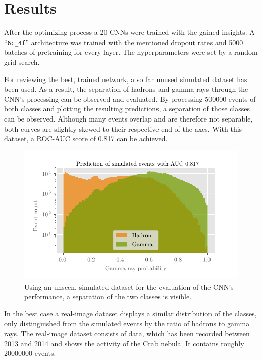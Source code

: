 \chapter{Results}

After the optimizing process a \num{20} CNNs were trained with the gained insights.
A \enquote{\texttt{6c\_4f}} architecture was trained with the mentioned dropout rates
and \num{5000} batches of pretraining for every layer.
The hyperparameters were set by a random grid search.

For reviewing the best, trained network, a so far unused simulated dataset has been used.
As a result, the separation of hadrons and gamma rays through the CNN's processing can be observed and evaluated.
By processing \num{500000} events of both classes and plotting the resulting predictions,
a separation of those classes can be observed.
Although many events overlap and are therefore not separable,
both curves are slightly skewed to their respective end of the axes.
With this dataset, a ROC-AUC score of \num{0.817} can be achieved.

\begin{figure}
    \centering
    \includegraphics[scale=1]{Plots/CNN_MC_Evaluation.pdf}
    \caption{Using an unseen, simulated dataset for the evaluation of the CNN's performance, a separation of the two classes is visible.}
    \label{fig:cnn_mc_evaluation}
\end{figure}

In the best case a real-image dataset displays a similar distribution of the classes,
only distinguished from the simulated events by the ratio of hadrons to gamma rays.
The real-image dataset consists of data,
which has been recorded between \num{2013} and \num{2014} and shows the activity of the Crab nebula.
It contains roughly \num{20000000} events.

